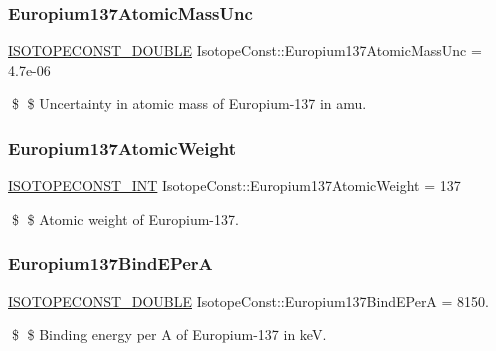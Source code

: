 \subsubsection{\texorpdfstring{Europium137\+Atomic\+Mass\+Unc}{Europium137AtomicMassUnc}}
{\footnotesize\ttfamily \mbox{\hyperlink{group___isotope_const-_macros_ga8f45a7272ce02c0b4c65c44636ed719a}{I\+S\+O\+T\+O\+P\+E\+C\+O\+N\+S\+T\+\_\+\+D\+O\+U\+B\+LE}} Isotope\+Const\+::\+Europium137\+Atomic\+Mass\+Unc = 4.\+7e-\/06}

\$ \$ Uncertainty in atomic mass of Europium-\/137 in amu. \mbox{\label{group___isotope_const-_europium-_eu137_gaba948a6826d3500e82c89b603956ab9e}} 
\subsubsection{\texorpdfstring{Europium137\+Atomic\+Weight}{Europium137AtomicWeight}}
{\footnotesize\ttfamily \mbox{\hyperlink{group___isotope_const-_macros_ga5f18360b3e99483a35c32d789e62621c}{I\+S\+O\+T\+O\+P\+E\+C\+O\+N\+S\+T\+\_\+\+I\+NT}} Isotope\+Const\+::\+Europium137\+Atomic\+Weight = 137}

\$ \$ Atomic weight of Europium-\/137. \mbox{\label{group___isotope_const-_europium-_eu137_gae3b917b5b98493db9cb1689e964b7c69}} 
\subsubsection{\texorpdfstring{Europium137\+Bind\+E\+PerA}{Europium137BindEPerA}}
{\footnotesize\ttfamily \mbox{\hyperlink{group___isotope_const-_macros_ga8f45a7272ce02c0b4c65c44636ed719a}{I\+S\+O\+T\+O\+P\+E\+C\+O\+N\+S\+T\+\_\+\+D\+O\+U\+B\+LE}} Isotope\+Const\+::\+Europium137\+Bind\+E\+PerA = 8150.}

\$ \$ Binding energy per A of Europium-\/137 in keV. \mbox{\label{group___isotope_const-_europium-_eu137_ga6b20c72fb10a1efeebb891ea603e3852}} 

